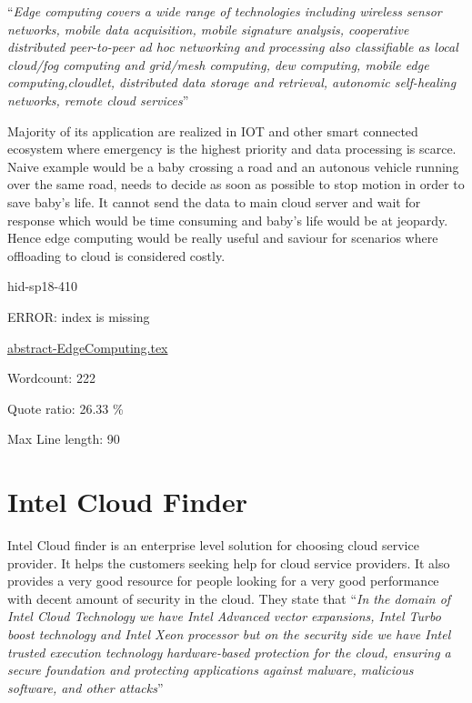 \color{blue}``\emph{Edge computing covers a wide range of technologies including wireless 
sensor networks, mobile data acquisition, mobile signature analysis, 
cooperative distributed peer-to-peer ad hoc networking and processing 
also classifiable as local cloud/fog computing and grid/mesh computing, 
dew computing, mobile edge computing,cloudlet, distributed data storage
and retrieval, autonomic self-healing networks,
remote cloud services}''\color{black}~\cite{hid-sp18-410-edge}

Majority of its application are realized in IOT and other smart connected
ecosystem where emergency is the highest priority and data processing
is scarce. Naive example would be a baby crossing a road and an autonous
vehicle running over the same road, needs to decide as soon as possible
to stop motion in order to save baby's life. It cannot send the data to
main cloud server and wait for response which would be time consuming and
baby's life would be at jeopardy.
Hence edge computing would be really useful and saviour for scenarios where
offloading to cloud is considered costly.


\begin{IU}

hid-sp18-410

ERROR: index is missing

\href{https://github.com/cloudmesh-community/hid-sp18-410/blob/master//technology/abstract-EdgeComputing.tex}{abstract-EdgeComputing.tex}

 

Wordcount: 222


Quote ratio: 26.33 \%
 
Max Line length: 90
\end{IU}

\section{Intel Cloud Finder}



Intel Cloud finder is an enterprise level solution for choosing cloud
service provider. It helps the customers seeking help for cloud
service providers. It also provides a very good resource for people
looking for a very good performance with decent amount of security in
the cloud. They state that \color{blue}``\emph{In the domain of Intel Cloud Technology
we have Intel Advanced vector expansions, Intel Turbo boost technology
and Intel Xeon processor but on the security side we have Intel
trusted execution technology hardware-based protection for the cloud,
ensuring a secure foundation and protecting applications against
malware, malicious software, and other attacks}''\color{black}~\cite{hid-sp18-410-Intel}

